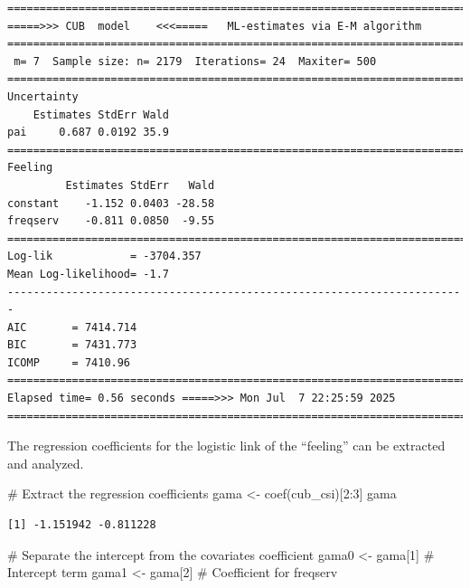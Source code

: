 \documentclass[
  letterpaper,
  DIV=11,
  numbers=noendperiod]{scrartcl}
\newenvironment{Shaded}{\begin{snugshade}}{\end{snugshade}}
\newcommand{\CommentTok}[1]{\textcolor[rgb]{0.37,0.37,0.37}{#1}}
\newcommand{\DecValTok}[1]{\textcolor[rgb]{0.68,0.00,0.00}{#1}}
\newcommand{\FunctionTok}[1]{\textcolor[rgb]{0.28,0.35,0.67}{#1}}
\newcommand{\NormalTok}[1]{\textcolor[rgb]{0.00,0.23,0.31}{#1}}
\newcommand{\OtherTok}[1]{\textcolor[rgb]{0.00,0.23,0.31}{#1}}
\newcommand{\SpecialCharTok}[1]{\textcolor[rgb]{0.37,0.37,0.37}{#1}}
\begin{document}
\begin{verbatim}
======================================================================= 
=====>>> CUB  model    <<<=====   ML-estimates via E-M algorithm   
======================================================================= 
 m= 7  Sample size: n= 2179  Iterations= 24  Maxiter= 500 
======================================================================= 
Uncertainty                                            
    Estimates StdErr Wald
pai     0.687 0.0192 35.9
======================================================================= 
Feeling                                            
         Estimates StdErr   Wald
constant    -1.152 0.0403 -28.58
freqserv    -0.811 0.0850  -9.55
======================================================================= 
Log-lik            = -3704.357 
Mean Log-likelihood= -1.7 
----------------------------------------------------------------------- 
AIC       = 7414.714 
BIC       = 7431.773 
ICOMP     = 7410.96 
======================================================================= 
Elapsed time= 0.56 seconds =====>>> Mon Jul  7 22:25:59 2025 
======================================================================= 
\end{verbatim}

The regression coefficients for the logistic link of the ``feeling'' can
be extracted and analyzed.

\begin{Shaded}
\begin{Highlighting}[]
\CommentTok{\# Extract the regression coefficients}
\NormalTok{gama }\OtherTok{\textless{}{-}} \FunctionTok{coef}\NormalTok{(cub\_csi)[}\DecValTok{2}\SpecialCharTok{:}\DecValTok{3}\NormalTok{]}
\NormalTok{gama}
\end{Highlighting}
\end{Shaded}

\begin{verbatim}
[1] -1.151942 -0.811228
\end{verbatim}

\begin{Shaded}
\begin{Highlighting}[]
\CommentTok{\# Separate the intercept from the covariate\textquotesingle{}s coefficient}
\NormalTok{gama0 }\OtherTok{\textless{}{-}}\NormalTok{ gama[}\DecValTok{1}\NormalTok{] }\CommentTok{\# Intercept term}
\NormalTok{gama1 }\OtherTok{\textless{}{-}}\NormalTok{ gama[}\DecValTok{2}\NormalTok{] }\CommentTok{\# Coefficient for freqserv}
\end{Highlighting}
\end{Shaded}
\end{document}
